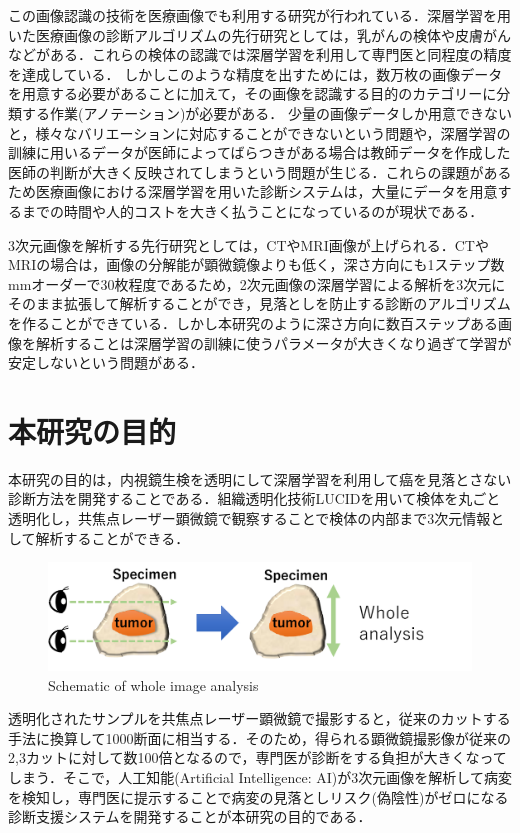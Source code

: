 この画像認識の技術を医療画像でも利用する研究が行われている．深層学習を用いた医療画像の診断アルゴリズムの先行研究としては，乳がん\cite{wang2016deep}の検体や皮膚がん\cite{esteva2017dermatologist}などがある．これらの検体の認識では深層学習を利用して専門医と同程度の精度を達成している．
しかしこのような精度を出すためには，数万枚の画像データを用意する必要があることに加えて，その画像を認識する目的のカテゴリーに分類する作業(アノテーション)が必要がある．
少量の画像データしか用意できないと，様々なバリエーションに対応することができないという問題や，深層学習の訓練に用いるデータが医師によってばらつきがある場合は教師データを作成した医師の判断が大きく反映されてしまうという問題が生じる．これらの課題があるため医療画像における深層学習を用いた診断システムは，大量にデータを用意するまでの時間や人的コストを大きく払うことになっているのが現状である．

3次元画像を解析する先行研究としては，CTやMRI画像が上げられる\cite{dou20163d}．CTやMRIの場合は，画像の分解能が顕微鏡像よりも低く，深さ方向にも1ステップ数mmオーダーで30枚程度であるため，2次元画像の深層学習による解析を3次元にそのまま拡張して解析することができ，見落としを防止する診断のアルゴリズムを作ることができている．しかし本研究のように深さ方向に数百ステップある画像を解析することは深層学習の訓練に使うパラメータが大きくなり過ぎて学習が安定しないという問題がある．

\section{本研究の目的}
本研究の目的は，内視鏡生検を透明にして深層学習を利用して癌を見落とさない診断方法を開発することである．組織透明化技術LUCIDを用いて検体を丸ごと透明化し，共焦点レーザー顕微鏡で観察することで検体の内部まで3次元情報として解析することができる．

\begin{figure}[H]
	\centering
	\includegraphics[width=0.9\linewidth]{fig/chapter1/whole_image_analysis}
	\caption{Schematic of whole image analysis}
	\label{fig:wholeimageanalysis}
\end{figure}

透明化されたサンプルを共焦点レーザー顕微鏡で撮影すると，従来のカットする手法に換算して1000断面に相当する．そのため，得られる顕微鏡撮影像が従来の2,3カットに対して数100倍となるので，専門医が診断をする負担が大きくなってしまう．そこで，人工知能(Artificial Intelligence: AI)が3次元画像を解析して病変を検知し，専門医に提示することで病変の見落としリスク(偽陰性)がゼロになる診断支援システムを開発することが本研究の目的である．

